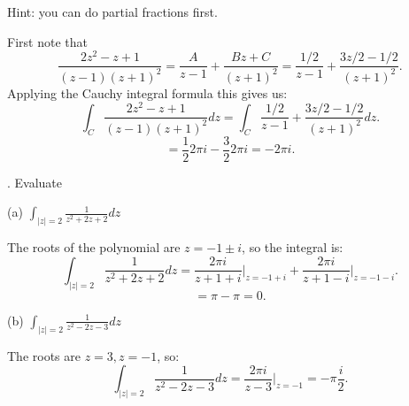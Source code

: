 \documentclass[letterpaper, reqno,11pt]{article}
\begin{document}
Hint: you can do partial fractions first.
\medskip

First note that
\[
\frac{2z^2-z+1}{(z-1)(z+1)^2}=\frac{A}{z-1}+\frac{Bz+C}{(z+1)^2}=\frac{1 /2}{z-1}+\frac{3z /2-1 /2}{(z+1)^2}
.\]
Applying the Cauchy integral formula this gives us: 
\[
\int_{C}\frac{2z^2-z+1}{(z-1)(z+1)^2}dz=\int_C\frac{1 /2}{z-1}+\frac{3z /2-1 /2}{(z+1)^2}dz
.\]
\[
=\frac{1}{2} 2\pi i-\frac{3}{2}2\pi i=-2\pi i
.\]


. Evaluate

(a) $\int_{|z|=2} \frac{1}{ z^2 +2z +2} dz$

The roots of the polynomial are $z=-1\pm i$, so the integral is: 
\[
\int_{|z|=2} \frac{1}{ z^2 +2z +2} dz=\frac{2\pi i}{z+1+i}\bigg|_{z=-1+i}+\frac{2\pi i}{z+1-i}\bigg|_{z=-1-i}
.\]
\[
=\pi-\pi=0
.\]

(b) $ \int_{|z|=2} \frac{ 1}{ z^2 -2z-3} dz $

The roots are $z=3, z=-1$, so: 
 \[
\int_{|z|=2} \frac{ 1}{ z^2 -2z-3} dz=\frac{2\pi i}{z-3}\bigg|_{z=-1}=-\pi \frac{i}{2}
.\]
\end{document}

